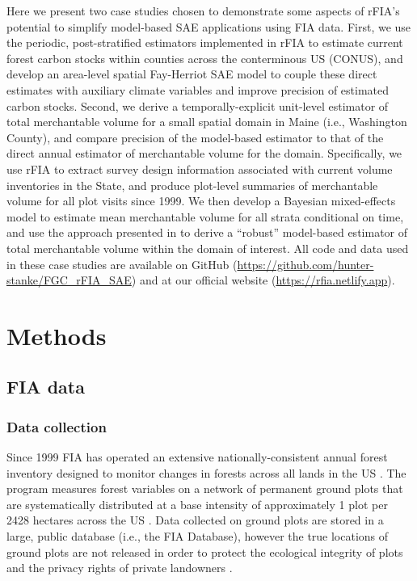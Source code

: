\documentclass[11pt]{article}
\begin{document}
Here we present two case studies chosen to demonstrate some aspects of rFIA's potential to simplify model-based SAE applications using FIA data. First, we use the periodic, post-stratified estimators implemented in rFIA to estimate current forest carbon stocks within counties across the conterminous US (CONUS), and develop an area-level spatial Fay-Herriot SAE model to couple these direct estimates with auxiliary climate variables and improve precision of estimated carbon stocks. Second, we derive a temporally-explicit unit-level estimator of total merchantable volume for a small spatial domain in Maine (i.e., Washington County), and compare precision of the model-based estimator to that of the direct annual estimator of merchantable volume for the domain. Specifically, we use rFIA to extract survey design information associated with current volume inventories in the State, and produce plot-level summaries of merchantable volume for all plot visits since 1999. We then develop a Bayesian mixed-effects model to estimate mean merchantable volume for all strata conditional on time, and use the approach presented in \citet{little2004model} to derive a ``robust'' model-based estimator of total merchantable volume within the domain of interest. All code and data used in these case studies are available on GitHub (\url{https://github.com/hunter-stanke/FGC_rFIA_SAE}) and at our official website (\url{https://rfia.netlify.app}).

\section*{Methods}

\subsection*{FIA data}

\subsubsection*{Data collection}
Since 1999 FIA has operated an extensive nationally-consistent annual forest inventory designed to monitor changes in forests across all lands in the US \citep{smith2002forest}. The program measures forest variables on a network of permanent ground plots that are systematically distributed at a base intensity of approximately 1 plot per 2428 hectares across the US \citep{smith2002forest}. Data collected on ground plots are stored in a large, public database (i.e., the FIA Database), however the true locations of ground plots are not released in order to protect the ecological integrity of plots and the privacy rights of private landowners \citep{shaw2008benefits}.
\end{document}
